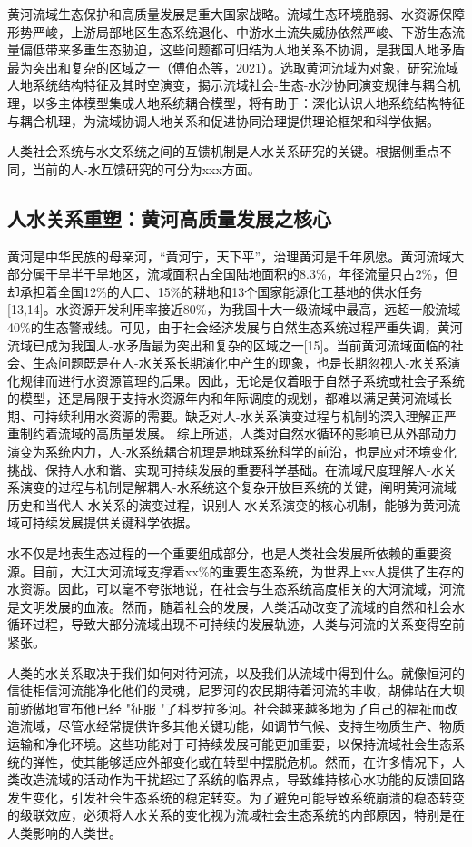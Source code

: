 黄河流域生态保护和高质量发展是重大国家战略。流域生态环境脆弱、水资源保障形势严峻，上游局部地区生态系统退化、中游水土流失威胁依然严峻、下游生态流量偏低带来多重生态胁迫，这些问题都可归结为人地关系不协调，是我国人地矛盾最为突出和复杂的区域之一（傅伯杰等，2021）。选取黄河流域为对象，研究流域人地系统结构特征及其时空演变，揭示流域社会-生态-水沙协同演变规律与耦合机理，以多主体模型集成人地系统耦合模型，将有助于：深化认识人地系统结构特征与耦合机理，为流域协调人地关系和促进协同治理提供理论框架和科学依据。

人类社会系统与水文系统之间的互馈机制是人水关系研究的关键。根据侧重点不同，当前的人-水互馈研究的可分为xxx方面。

\subsection{人水关系重塑：黄河高质量发展之核心}

黄河是中华民族的母亲河，“黄河宁，天下平”，治理黄河是千年夙愿。黄河流域大部分属干旱半干旱地区，流域面积占全国陆地面积的8.3\%，年径流量只占2\%，但却承担着全国12\%的人口、15\%的耕地和13个国家能源化工基地的供水任务[13,14]。水资源开发利用率接近80\%，为我国十大一级流域中最高，远超一般流域40\%的生态警戒线。可见，由于社会经济发展与自然生态系统过程严重失调，黄河流域已成为我国人-水矛盾最为突出和复杂的区域之一[15]。当前黄河流域面临的社会、生态问题既是在人-水关系长期演化中产生的现象，也是长期忽视人-水关系演化规律而进行水资源管理的后果。因此，无论是仅着眼于自然子系统或社会子系统的模型，还是局限于支持水资源年内和年际调度的规划，都难以满足黄河流域长期、可持续利用水资源的需要。缺乏对人-水关系演变过程与机制的深入理解正严重制约着流域的高质量发展。
综上所述，人类对自然水循环的影响已从外部动力演变为系统内力，人-水系统耦合机理是地球系统科学的前沿，也是应对环境变化挑战、保持人水和谐、实现可持续发展的重要科学基础。在流域尺度理解人-水关系演变的过程与机制是解耦人-水系统这个复杂开放巨系统的关键，阐明黄河流域历史和当代人-水关系的演变过程，识别人-水关系演变的核心机制，能够为黄河流域可持续发展提供关键科学依据。

水不仅是地表生态过程的一个重要组成部分，也是人类社会发展所依赖的重要资源。目前，大江大河流域支撑着xx\%的重要生态系统，为世界上xx人提供了生存的水资源。因此，可以毫不夸张地说，在社会与生态系统高度相关的大河流域，河流是文明发展的血液。然而，随着社会的发展，人类活动改变了流域的自然和社会水循环过程，导致大部分流域出现不可持续的发展轨迹，人类与河流的关系变得空前紧张。

人类的水关系取决于我们如何对待河流，以及我们从流域中得到什么。就像恒河的信徒相信河流能净化他们的灵魂，尼罗河的农民期待着河流的丰收，胡佛站在大坝前骄傲地宣布他已经 "征服 "了科罗拉多河。社会越来越多地为了自己的福祉而改造流域，尽管水经常提供许多其他关键功能，如调节气候、支持生物质生产、物质运输和净化环境。这些功能对于可持续发展可能更加重要，以保持流域社会生态系统的弹性，使其能够适应外部变化或在转型中摆脱危机。然而，在许多情况下，人类改造流域的活动作为干扰超过了系统的临界点，导致维持核心水功能的反馈回路发生变化，引发社会生态系统的稳定转变。为了避免可能导致系统崩溃的稳态转变的级联效应，必须将人水关系的变化视为流域社会生态系统的内部原因，特别是在人类影响的人类世。

